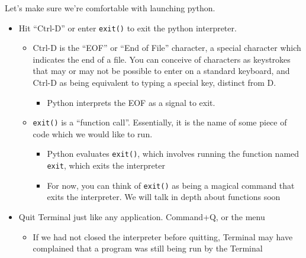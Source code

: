 Let's make sure we're comfortable with launching python.
\begin{itemize}
    \item Hit ``Ctrl-D'' or enter \texttt{exit()} to exit the python interpreter.
    \begin{itemize}
        \item Ctrl-D is the ``EOF'' or ``End of File'' character, a special character which indicates the end of a file.
            You can conceive of characters as keystrokes that may or may not be possible to enter on a standard keyboard, and Ctrl-D as being equivalent to typing a special key, distinct from D.
        \begin{itemize}
            \item Python interprets the EOF as a signal to exit.
        \end{itemize}
    \item \texttt{exit()} is a ``function call''. Essentially, it is the name of some piece of code which we would like to run.
        \begin{itemize}
            \item Python evaluates \texttt{exit()}, which involves running the function named \texttt{exit}, which exits the interpreter
            \item For now, you can think of \texttt{exit()} as being a magical command that exits the interpreter. We will talk in depth about functions soon
        \end{itemize}
    \end{itemize}
    \item Quit Terminal just like any application. Command+Q, or the menu
    \begin{itemize}
        \item If we had not closed the interpreter before quitting, Terminal may have complained that a program was still being run by the Terminal
    \end{itemize}
\end{itemize}


